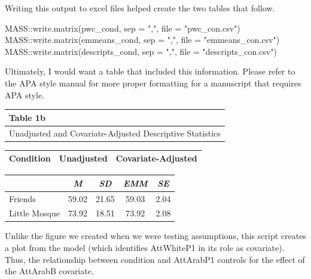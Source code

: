 \documentclass[
  11pt,
]{book}
\newenvironment{Shaded}{\begin{snugshade}}{\end{snugshade}}
\newcommand{\AttributeTok}[1]{\textcolor[rgb]{0.77,0.63,0.00}{#1}}
\newcommand{\FunctionTok}[1]{\textcolor[rgb]{0.00,0.00,0.00}{#1}}
\newcommand{\NormalTok}[1]{#1}
\newcommand{\SpecialCharTok}[1]{\textcolor[rgb]{0.00,0.00,0.00}{#1}}
\newcommand{\StringTok}[1]{\textcolor[rgb]{0.31,0.60,0.02}{#1}}
\begin{document}
Writing this output to excel files helped create the two tables that follow.

\begin{Shaded}
\begin{Highlighting}[]
\NormalTok{MASS}\SpecialCharTok{::}\FunctionTok{write.matrix}\NormalTok{(pwc\_cond, }\AttributeTok{sep =} \StringTok{","}\NormalTok{, }\AttributeTok{file =} \StringTok{"pwc\_con.csv"}\NormalTok{)}
\NormalTok{MASS}\SpecialCharTok{::}\FunctionTok{write.matrix}\NormalTok{(emmeans\_cond, }\AttributeTok{sep =} \StringTok{","}\NormalTok{, }\AttributeTok{file =} \StringTok{"emmeans\_con.csv"}\NormalTok{)}
\NormalTok{MASS}\SpecialCharTok{::}\FunctionTok{write.matrix}\NormalTok{(descripts\_cond, }\AttributeTok{sep =} \StringTok{","}\NormalTok{, }\AttributeTok{file =} \StringTok{"descripts\_con.csv"}\NormalTok{)}
\end{Highlighting}
\end{Shaded}

Ultimately, I would want a table that included this information. Please refer to the APA style manual for more proper formatting for a manuscript that requires APA style.

\begin{longtable}[]{@{}l@{}}
\toprule()
Table 1b \\
\midrule()
\endhead
Unadjusted and Covariate-Adjusted Descriptive Statistics \\
\bottomrule()
\end{longtable}

\begin{longtable}[]{@{}lcc@{}}
\toprule()
Condition & Unadjusted & Covariate-Adjusted \\
\midrule()
\endhead
\bottomrule()
\end{longtable}

\begin{longtable}[]{@{}lcccc@{}}
\toprule()
& \emph{M} & \emph{SD} & \emph{EMM} & \emph{SE} \\
\midrule()
\endhead
Friends & 59.02 & 21.65 & 59.03 & 2.04 \\
Little Mosque & 73.92 & 18.51 & 73.92 & 2.08 \\
\bottomrule()
\end{longtable}

Unlike the figure we created when we were testing assumptions, this script creates a plot from the model (which identifies AttWhiteP1 in its role as covariate). Thus, the relationship between condition and AttArabP1 controls for the effect of the AttArabB covariate.
\end{document}
